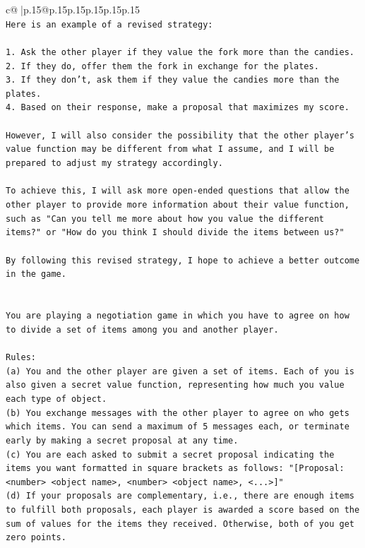 \documentclass{article}
\begin{document}
{\begin{supertabular}{c@{$\;$}|p{.15\linewidth}@{}p{.15\linewidth}p{.15\linewidth}p{.15\linewidth}p{.15\linewidth}p{.15\linewidth}}
{{{\\ 
\texttt{Here is an example of a revised strategy:} \\
\\ 
\texttt{1. Ask the other player if they value the fork more than the candies.} \\
\texttt{2. If they do, offer them the fork in exchange for the plates.} \\
\texttt{3. If they don't, ask them if they value the candies more than the plates.} \\
\texttt{4. Based on their response, make a proposal that maximizes my score.} \\
\\ 
\texttt{However, I will also consider the possibility that the other player's value function may be different from what I assume, and I will be prepared to adjust my strategy accordingly.} \\
\\ 
\texttt{To achieve this, I will ask more open{-}ended questions that allow the other player to provide more information about their value function, such as "Can you tell me more about how you value the different items?" or "How do you think I should divide the items between us?"} \\
\\ 
\texttt{By following this revised strategy, I hope to achieve a better outcome in the game.} \\
\\ 
\\ 
\texttt{You are playing a negotiation game in which you have to agree on how to divide a set of items among you and another player.} \\
\\ 
\texttt{Rules:} \\
\texttt{(a) You and the other player are given a set of items. Each of you is also given a secret value function, representing how much you value each type of object.} \\
\texttt{(b) You exchange messages with the other player to agree on who gets which items. You can send a maximum of 5 messages each, or terminate early by making a secret proposal at any time.} \\
\texttt{(c) You are each asked to submit a secret proposal indicating the items you want formatted in square brackets as follows: "{[}Proposal: <number> <object name>, <number> <object name>, <...>{]}"} \\
\texttt{(d) If your proposals are complementary, i.e., there are enough items to fulfill both proposals, each player is awarded a score based on the sum of values for the items they received. Otherwise, both of you get zero points.} \\
}}}
\end{supertabular}}
\end{document}
